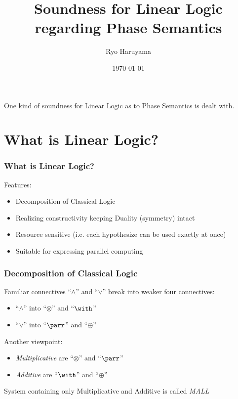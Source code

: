 \documentclass[dvipdfmx,cjk]{beamer}
\theoremstyle{example}
\begin{document}
\title[LL]{Soundness for Linear Logic regarding Phase Semantics} 
\author[Haruyama]{Ryo Haruyama}
\date{\today}

\begin{frame}
  \titlepage
\end{frame}

\begin{frame}
  One kind of soundness for Linear Logic as to Phase Semantics is dealt with.
  \tableofcontents
\end{frame}

\section{What is Linear Logic?}
                          
\begin{frame}
  \frametitle{What is Linear Logic?}
  Features:

  \begin{itemize}
    \item Decomposition of Classical Logic 
    \item Realizing constructivity keeping Duality (symmetry) intact 
    \item Resource sensitive (i.e. each hypothesize can be used exactly at once) 
    \item Suitable for expressing parallel computing
  \end{itemize}
  
\end{frame}

\begin{frame}
  \frametitle{Decomposition of Classical Logic} 

    Familiar connectives ``$\wedge$'' and ``$\vee$'' break into weaker four connectives:

    \begin{itemize}
      \item ``$\wedge$'' into ``$\otimes$'' and ``$\with$'' 
      \item ``$\vee$''   into ``$\parr$''   and ``$\oplus$'' 
    \end{itemize}

    Another viewpoint:

    \begin{itemize}
      \item \textit{Multiplicative} are ``$\otimes$'' and ``$\parr$'' 
      \item \textit{Additive} are ``$\with$''   and ``$\oplus$'' 
    \end{itemize}

    System containing only Multiplicative and Additive is called \textit{MALL}
    
\end{frame}
\end{document}
